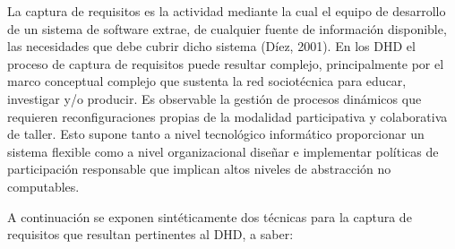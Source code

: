 La captura de requisitos es la actividad mediante la cual el equipo de desarrollo
de un sistema de software extrae, de cualquier fuente de información disponible,
las necesidades que debe cubrir dicho sistema (Díez, 2001). En los DHD el
proceso de captura de requisitos puede resultar complejo, principalmente por el marco conceptual complejo que sustenta la red sociotécnica para educar, investigar y/o producir.
Es observable la gestión de procesos dinámicos que requieren reconfiguraciones
propias de la modalidad participativa y colaborativa de taller. Esto supone
tanto a nivel tecnológico informático proporcionar un sistema flexible como a
nivel organizacional diseñar e implementar políticas de participación
responsable que implican altos niveles de abstracción no computables.
\label{no_computable}

A continuación se exponen sintéticamente dos técnicas para la captura de requisitos que resultan
pertinentes al DHD, a saber:


